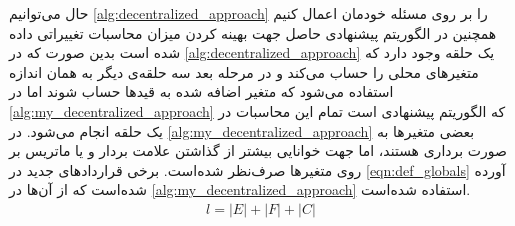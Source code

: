 حال می‌توانیم \cref{alg:decentralized_approach} را بر روی مسئله خودمان اعمال کنیم همچنین در الگوریتم پیشنهادی حاصل جهت بهینه کردن میزان محاسبات تغییراتی داده شده است بدین صورت که در \cref{alg:decentralized_approach} یک حلقه‌ وجود دارد که متغیرهای محلی را حساب می‌کند و در مرحله بعد سه حلقه‌ی دیگر به همان اندازه استفاده می‌شود که متغیر اضافه شده به قیدها حساب شوند اما در \cref{alg:my_decentralized_approach} که الگوریتم پیشنهادی است تمام این محاسبات در یک حلقه انجام می‌شود. در \cref{alg:my_decentralized_approach} بعضی متغیرها به صورت برداری هستند، اما جهت خوانایی بیشتر از گذاشتن علامت بردار و یا ماتریس بر روی متغیرها صرف‌نظر شده‌است. برخی قراردادهای جدید در \cref{eqn:def_globals} آورده شده‌است که از آن‌ها در \cref{alg:my_decentralized_approach} استفاده شده‌است.
	\begin{align}\label{eqn:def_globals}
		l = |E| + |F| + |C|
	\end{align}
	
